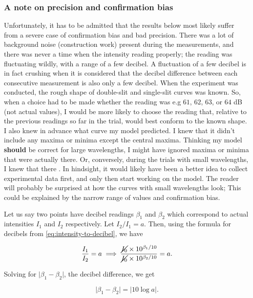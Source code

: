\documentclass{paper}
\begin{document}
\subsubsection{A note on precision and confirmation bias}
\label{section:precision-and-bias}
Unfortunately, it has to be admitted that the results below most likely suffer from a severe case of confirmation bias and bad precision. There was a lot of background noise (construction work) present during the measurements, and there was never a time when the intensity reading  properly; the reading was fluctuating wildly, with a range of a few decibel. A fluctuation of a few decibel is in fact crushing when it is considered that the decibel difference between each consecutive measurement is also only a few decibel. When the experiment was conducted, the rough shape of double-slit and single-slit curves was known. So, when a choice had to be made whether the reading was e.g $61$, $62$, $63$, or $64$ dB (not actual values), I would be more likely to choose the reading that, relative to the previous readings so far in the trial, would best conform to the known shape. I also knew in advance what curve my model predicted. I knew that it didn't include any maxima or minima except the central maxima. Thinking my model \textbf{should} be correct for large wavelengths, I might have ignored maxima or minima that were actually there. Or, conversely, during the trials with small wavelengths, I knew that there . In hindsight, it would likely have been a better idea to collect experimental data first, and only then start working on the model. The reader will probably be surprised at how  the curves with small wavelengths look; This could be explained by the narrow range of values and confirmation bias.

Let us say two points have decibel readings $\beta_1$ and $\beta_2$ which correspond to actual intensities $I_1$ and $I_2$ respectively. Let $I_2 / I_1 = a$. Then, using the formula for decibels from \eqref{eq:intensity-to-decibel}, we have

\begin{equation*}
    \frac{I_1}{I_2} = a \implies \frac{\cancel{I_0} \times 10^{\beta_1 / 10}}{\cancel{I_0} \times 10^{\beta_2 / 10}} = a.
\end{equation*}

Solving for $\lvert \beta_1 - \beta_2\rvert$, the decibel difference, we get

\begin{equation*}
    \lvert \beta_1 - \beta_2 \rvert = \lvert 10\log a \rvert.
\end{equation*}
\end{document}
